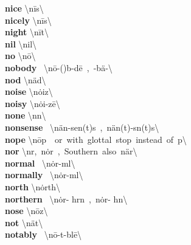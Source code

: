 \documentclass[10pt,a4paper]{article}
\begin{document}
\begin{multicols}{2}
\textbf{ nice }\quad \textbackslash \textprimstress n\={i}s\textbackslash \\
\textbf{ nicely }\quad \textbackslash \textprimstress n\={i}s\textbackslash \\
\textbf{ night }\quad \textbackslash \textprimstress n\={i}t\textbackslash \\
\textbf{ nil }\quad \textbackslash \textprimstress nil\textbackslash \\
\textbf{ no }\quad \textbackslash \textprimstress n\={o}\textbackslash \\
\textbf{ nobody }\quad \ \textbackslash \textprimstress n\={o}-(\textsecstress )b\textschwa -d\={e}\ ,\ -\textsecstress b\"{a}-\textbackslash \\
\textbf{ nod }\quad \textbackslash \textprimstress n\"{a}d\textbackslash \\
\textbf{ noise }\quad \textbackslash \textprimstress n\.{o}iz\textbackslash \\
\textbf{ noisy }\quad \textbackslash \textprimstress n\.{o}i-z\={e}\textbackslash \\
\textbf{ none }\quad \textbackslash \textprimstress n\textschwa n\textbackslash \\
\textbf{ nonsense }\quad \ \textbackslash \textsecstress n\"{a}n-\textsecstress sen(t)s\ ,\ \textprimstress n\"{a}n(t)-s\textschwa n(t)s\textbackslash \\
\textbf{ nope }\quad \textbackslash \textprimstress n\={o}p\ \ or\ with\ glottal\ stop\ instead\ of\ p\textbackslash \\
\textbf{ nor }\quad \textbackslash n\textschwa r,\ \textprimstress n\.{o}r\ ,\ Southern\ also\ \textprimstress n\"{a}r\textbackslash \\
\textbf{ normal }\quad \ \textbackslash \textprimstress n\.{o}r-m\textschwa l\textbackslash \\
\textbf{ normally }\quad \ \textbackslash \textprimstress n\.{o}r-m\textschwa l\textbackslash \\
\textbf{ north }\quad \textbackslash \textprimstress n\.{o}rth\textbackslash \\
\textbf{ northern }\quad \ \textbackslash \textprimstress n\.{o}r- h\textschwa rn\ ,\ \textprimstress n\.{o}r- h\textschwa n\textbackslash \\
\textbf{ nose }\quad \textbackslash \textprimstress n\={o}z\textbackslash \\
\textbf{ not }\quad \textbackslash \textprimstress n\"{a}t\textbackslash \\
\textbf{ notably }\quad \ \textbackslash \textprimstress n\={o}-t\textschwa -bl\={e}\textbackslash \\

\end{multicols}
\end{document}
